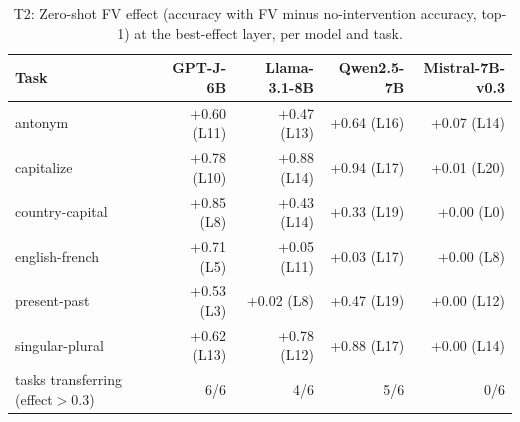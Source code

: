 \begin{table}[t]
\centering
\small
\begin{tabular}{lrrrr}
\toprule
Task & GPT-J-6B & Llama-3.1-8B & Qwen2.5-7B & Mistral-7B-v0.3 \\
\midrule
antonym & +0.60 (L11) & +0.47 (L13) & +0.64 (L16) & +0.07 (L14) \\
capitalize & +0.78 (L10) & +0.88 (L14) & +0.94 (L17) & +0.01 (L20) \\
country-capital & +0.85 (L8) & +0.43 (L14) & +0.33 (L19) & +0.00 (L0) \\
english-french & +0.71 (L5) & +0.05 (L11) & +0.03 (L17) & +0.00 (L8) \\
present-past & +0.53 (L3) & +0.02 (L8) & +0.47 (L19) & +0.00 (L12) \\
singular-plural & +0.62 (L13) & +0.78 (L12) & +0.88 (L17) & +0.00 (L14) \\
tasks transferring (effect$>$0.3) & 6/6 & 4/6 & 5/6 & 0/6 \\
\bottomrule
\end{tabular}
\caption{T2: Zero-shot FV effect (accuracy with FV minus no-intervention accuracy, top-1) at the best-effect layer, per model and task.}
\label{tab:T2_generalization}
\end{table}
